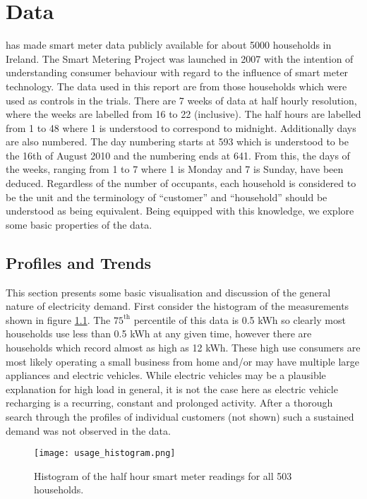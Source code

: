 
\chapter{Data} \label{sec:results}

\citet{issda} has made smart meter data publicly available for about 5000 households in Ireland. The Smart Metering Project was launched in 2007 with the intention of understanding consumer behaviour with regard to the influence of smart meter technology. The data used in this report are from those households which were used as controls in the trials. There are 7 weeks of data at half hourly resolution, where the weeks are labelled from 16 to 22 (inclusive). The half hours are labelled from 1 to 48 where 1 is understood to correspond to midnight. Additionally days are also numbered. The day numbering starts at 593 which is understood to be the 16th of August 2010 and the numbering ends at 641. From this, the days of the weeks, ranging from 1 to 7 where 1 is Monday and 7 is Sunday, have been deduced. Regardless of the number of occupants, each household is considered to be the unit and the terminology of ``customer'' and ``household'' should be understood as being equivalent. Being equipped with this knowledge, we explore some basic properties of the data.

\section{Profiles and Trends}
\label{subsec:basic} 
This section presents some basic visualisation and discussion of the general nature of electricity demand. First consider the histogram of the measurements shown in figure \ref{fig:hist}. The $75^{\text{th}}$ percentile of this data is 0.5 kWh so clearly most households use less than 0.5 kWh at any given time, however there are households which record almost as high as 12 kWh. These high use consumers are most likely operating a small business from home and/or may have multiple large appliances and electric vehicles. While electric vehicles may be a plausible explanation for high load in general, it is not the case here as electric vehicle recharging is a recurring, constant and prolonged activity. After a thorough search through the profiles of individual customers (not shown) such a sustained demand was not observed in the data.

\begin{figure}
\centering
\texttt{[image: usage\_histogram.png]}
\caption{Histogram of the half hour smart meter readings for all 503 households.}
\label{fig:hist} 
\end{figure}

